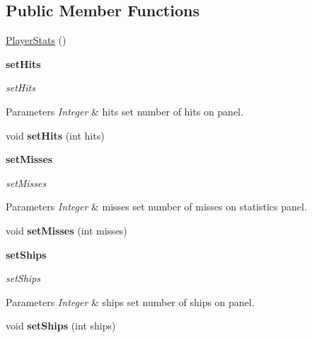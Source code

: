 \subsection*{Public Member Functions}
\begin{DoxyCompactItemize}
\item 
\hyperlink{classbattleship_1_1screen_1_1PlayerStats_afc851e7e987f339a42e16a445b535519}{Player\+Stats} ()
\end{DoxyCompactItemize}
\begin{Indent}{\bf set\+Hits}\par
{\em set\+Hits


\begin{DoxyParams}{Parameters}
{\em Integer} & hits set number of hits on panel. \\
\hline
\end{DoxyParams}
}\begin{DoxyCompactItemize}
\item 
\hypertarget{classbattleship_1_1screen_1_1PlayerStats_ad1a1e28ff349788ff58a737ec6d66eca}{}void {\bfseries set\+Hits} (int hits)\label{classbattleship_1_1screen_1_1PlayerStats_ad1a1e28ff349788ff58a737ec6d66eca}

\end{DoxyCompactItemize}
\end{Indent}
\begin{Indent}{\bf set\+Misses}\par
{\em set\+Misses


\begin{DoxyParams}{Parameters}
{\em Integer} & misses set number of misses on statistics panel. \\
\hline
\end{DoxyParams}
}\begin{DoxyCompactItemize}
\item 
\hypertarget{classbattleship_1_1screen_1_1PlayerStats_aa4fb21ddf2f89f404f95e0ae2a4a2b21}{}void {\bfseries set\+Misses} (int misses)\label{classbattleship_1_1screen_1_1PlayerStats_aa4fb21ddf2f89f404f95e0ae2a4a2b21}

\end{DoxyCompactItemize}
\end{Indent}
\begin{Indent}{\bf set\+Ships}\par
{\em set\+Ships


\begin{DoxyParams}{Parameters}
{\em Integer} & ships set number of ships on panel. \\
\hline
\end{DoxyParams}
}\begin{DoxyCompactItemize}
\item 
\hypertarget{classbattleship_1_1screen_1_1PlayerStats_a0c8fb0c5d714fd495e80ee631598d87e}{}void {\bfseries set\+Ships} (int ships)\label{classbattleship_1_1screen_1_1PlayerStats_a0c8fb0c5d714fd495e80ee631598d87e}

\end{DoxyCompactItemize}
\end{Indent}


